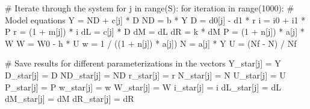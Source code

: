 \documentclass[
  letterpaper,
  DIV=11,
  numbers=noendperiod]{scrreprt}
\newenvironment{Shaded}{\begin{snugshade}}{\end{snugshade}}
\newcommand{\BuiltInTok}[1]{\textcolor[rgb]{0.00,0.23,0.31}{#1}}
\newcommand{\CommentTok}[1]{\textcolor[rgb]{0.37,0.37,0.37}{#1}}
\newcommand{\ControlFlowTok}[1]{\textcolor[rgb]{0.00,0.23,0.31}{#1}}
\newcommand{\DecValTok}[1]{\textcolor[rgb]{0.68,0.00,0.00}{#1}}
\newcommand{\KeywordTok}[1]{\textcolor[rgb]{0.00,0.23,0.31}{#1}}
\newcommand{\NormalTok}[1]{\textcolor[rgb]{0.00,0.23,0.31}{#1}}
\newcommand{\OperatorTok}[1]{\textcolor[rgb]{0.37,0.37,0.37}{#1}}
\begin{document}
\begin{tcolorbox}
\begin{Shaded}
\begin{Highlighting}[]
\CommentTok{\# Iterate through the system}
\ControlFlowTok{for}\NormalTok{ j }\KeywordTok{in} \BuiltInTok{range}\NormalTok{(S):}
    \ControlFlowTok{for}\NormalTok{ iteration }\KeywordTok{in} \BuiltInTok{range}\NormalTok{(}\DecValTok{1000}\NormalTok{):}
        \CommentTok{\# Model equations}
\NormalTok{        Y }\OperatorTok{=}\NormalTok{ ND }\OperatorTok{+}\NormalTok{ c[j] }\OperatorTok{*}\NormalTok{ D}
\NormalTok{        ND }\OperatorTok{=}\NormalTok{ b }\OperatorTok{*}\NormalTok{ Y}
\NormalTok{        D }\OperatorTok{=}\NormalTok{ d0[j] }\OperatorTok{{-}}\NormalTok{ d1 }\OperatorTok{*}\NormalTok{ r}
\NormalTok{        i }\OperatorTok{=}\NormalTok{ i0 }\OperatorTok{+}\NormalTok{ i1 }\OperatorTok{*}\NormalTok{ P}
\NormalTok{        r }\OperatorTok{=}\NormalTok{ (}\DecValTok{1} \OperatorTok{+}\NormalTok{ m[j]) }\OperatorTok{*}\NormalTok{ i}
\NormalTok{        dL }\OperatorTok{=}\NormalTok{ c[j] }\OperatorTok{*}\NormalTok{ D}
\NormalTok{        dM }\OperatorTok{=}\NormalTok{ dL}
\NormalTok{        dR }\OperatorTok{=}\NormalTok{ k }\OperatorTok{*}\NormalTok{ dM}
\NormalTok{        P }\OperatorTok{=}\NormalTok{ (}\DecValTok{1} \OperatorTok{+}\NormalTok{ n[j]) }\OperatorTok{*}\NormalTok{ a[j] }\OperatorTok{*}\NormalTok{ W}
\NormalTok{        W }\OperatorTok{=}\NormalTok{ W0 }\OperatorTok{{-}}\NormalTok{ h }\OperatorTok{*}\NormalTok{ U}
\NormalTok{        w }\OperatorTok{=} \DecValTok{1} \OperatorTok{/}\NormalTok{ ((}\DecValTok{1} \OperatorTok{+}\NormalTok{ n[j]) }\OperatorTok{*}\NormalTok{ a[j])}
\NormalTok{        N }\OperatorTok{=}\NormalTok{ a[j] }\OperatorTok{*}\NormalTok{ Y}
\NormalTok{        U }\OperatorTok{=}\NormalTok{ (Nf }\OperatorTok{{-}}\NormalTok{ N) }\OperatorTok{/}\NormalTok{ Nf}

    \CommentTok{\# Save results for different parameterizations in the vectors}
\NormalTok{    Y\_star[j] }\OperatorTok{=}\NormalTok{ Y}
\NormalTok{    D\_star[j] }\OperatorTok{=}\NormalTok{ D}
\NormalTok{    ND\_star[j] }\OperatorTok{=}\NormalTok{ ND}
\NormalTok{    r\_star[j] }\OperatorTok{=}\NormalTok{ r}
\NormalTok{    N\_star[j] }\OperatorTok{=}\NormalTok{ N}
\NormalTok{    U\_star[j] }\OperatorTok{=}\NormalTok{ U}
\NormalTok{    P\_star[j] }\OperatorTok{=}\NormalTok{ P}
\NormalTok{    w\_star[j] }\OperatorTok{=}\NormalTok{ w}
\NormalTok{    W\_star[j] }\OperatorTok{=}\NormalTok{ W}
\NormalTok{    i\_star[j] }\OperatorTok{=}\NormalTok{ i}
\NormalTok{    dL\_star[j] }\OperatorTok{=}\NormalTok{ dL}
\NormalTok{    dM\_star[j] }\OperatorTok{=}\NormalTok{ dM}
\NormalTok{    dR\_star[j] }\OperatorTok{=}\NormalTok{ dR}
\end{Highlighting}
\end{Shaded}

\end{tcolorbox}
\end{document}
